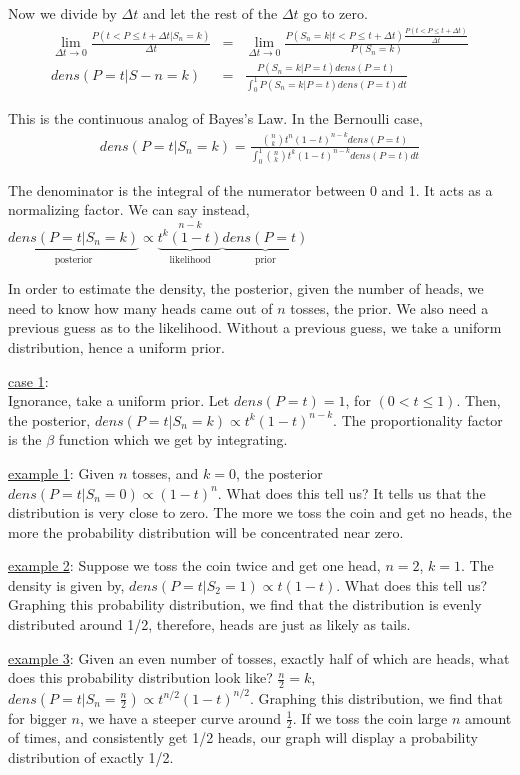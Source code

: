 Now we divide by $\Delta t$ and let the rest of the $\Delta t$ go to zero.
\begin{eqnarray*}
\lim_{\Delta t\to 0}\frac{P(t<P\leq t+\Delta t|S_n=k)}{\Delta t}&=&\lim_{\Delta t\to 0}\frac{P(S_n=k|t<P\leq t+\Delta t) \frac{P(t<P\leq t+\Delta t)}{\Delta t}}{P(S_n=k)} \\
dens(P=t|S-n=k)&=&\frac{P(S_n=k|P=t)dens(P=t)}{\displaystyle\int_0^1\!\!P(S_n=k|P=t)dens(P=t)dt}
\end{eqnarray*}

This is the continuous analog of Bayes's Law.  In the Bernoulli case,
\begin{eqnarray*}
dens(P=t|S_n=k)=\frac{{n\choose k}t^n(1-t)^{n-k}dens(P=t)}{\displaystyle\int_0^1\!\! {n\choose k}t^k(1-t)^{n-k}dens(P=t)dt}
\end{eqnarray*}

The denominator is the integral of the numerator between 0 and 1.  It acts as a normalizing factor.  We can say instead,
$\underbrace{dens(P=t|S_n=k)}_{\mbox{posterior}}\propto\underbrace{t^k(1-t)}_{\mbox{likelihood}}^{n-k}\underbrace{dens(P=t)}_{\mbox{prior}}$

In order to estimate the density, the posterior, given the number of heads, we need to know how many heads came out of $n$ tosses, the prior.  We also need a previous guess as to the likelihood.  Without a previous guess, we take a uniform distribution, hence a uniform prior.

\noindent\underline{case 1}:\\
Ignorance, take a uniform prior.  Let $dens(P=t)=1$, for $(0<t\leq 1)$.  Then, the posterior, $dens(P=t|S_n=k)\propto t^k(1-t)^{n-k}$.  The proportionality factor is the $\beta$ function which we get by integrating.

\noindent\underline{example 1}:  Given $n$ tosses, and $k=0$, the posterior $dens(P=t|S_n=0)\propto (1-t)^n$.  What does this tell us?  It tells us that the distribution is very close to zero.  The more we toss the coin and get no heads, the more the probability distribution will be concentrated near zero.

\noindent\underline{example 2}:  Suppose we toss the coin twice and get one head, $n=2$, $k=1$.  The density is given by, $dens(P=t|S_2=1)\propto t(1-t)$.  What does this tell us?  Graphing this probability distribution, we find that the distribution is evenly distributed around 1/2, therefore, heads are just as likely as tails.

\noindent\underline{example 3}:  Given an even number of tosses, exactly half of which are heads, what does this probability distribution look like?  $\frac{n}{2}=k$, $dens(P=t|S_n=\frac{n}{2})\propto t^{n/2}(1-t)^{n/2}$.  Graphing this distribution, we find that for bigger $n$, we have a steeper curve around $\frac{1}{2}$.  If we toss the coin large $n$ amount of times, and consistently get 1/2 heads, our graph will display a probability distribution of exactly 1/2.

